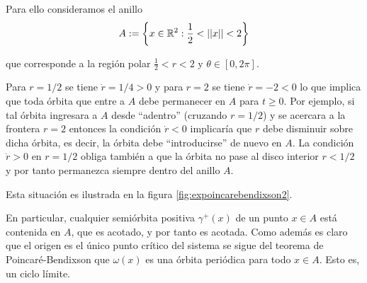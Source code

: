 \begin{example}
Para ello consideramos el anillo
$$ A := \left\{ x \in {\ensuremath{\mathbb{R}}}^2 : \frac{1}{2} < ||x|| < 2 \right\} $$

que corresponde a la región polar $\frac{1}{2} < r < 2$ y $\theta \in [0,2\pi]$.

Para $r = 1/2$ se tiene $\dot{r} = 1/4 > 0$ y para $r = 2$ se tiene $\dot{r} = -2 < 0$ lo que implica que toda órbita que entre a $A$ debe permanecer en $A$ para $t \geq 0$.
Por ejemplo, si tal órbita ingresara a $A$ desde ``adentro'' (cruzando $r = 1/2$) y se acercara a la frontera $r = 2$ entonces la condición $\dot{r} < 0$ implicaría que $r$ debe disminuir sobre dicha órbita, es decir, la órbita debe ``introducirse'' de nuevo en $A$. La condición $\dot{r} > 0$ en $r = 1/2$ obliga también a que la órbita no pase al disco interior $r < 1/2$ y por tanto permanezca siempre dentro del anillo $A$.

Esta situación es ilustrada en la figura \ref{fig:expoincarebendixson2}.

En particular, cualquier semiórbita positiva $\gamma^+(x)$ de un punto $x \in A$ está contenida en $A$, que es acotado, y por tanto es acotada. Como además es claro que el origen es el único punto crítico del sistema se sigue del teorema de Poincaré-Bendixson que $\omega(x)$ es una órbita periódica para todo $x \in A$. Esto es, un ciclo límite.


\end{example}
